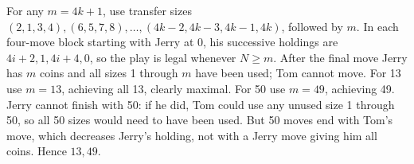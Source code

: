 For any $m=4k+1$, use transfer sizes $(2,1,3,4),(6,5,7,8),\ldots,(4k-2,4k-3,4k-1,4k)$, followed by $m$. In each four-move block starting with Jerry at 0, his successive holdings are $4i+2,1,4i+4,0$, so the play is legal whenever $N\ge m$. After the final move Jerry has $m$ coins and all sizes 1 through $m$ have been used; Tom cannot move. For 13 use $m=13$, achieving all 13, clearly maximal. For 50 use $m=49$, achieving 49. Jerry cannot finish with 50: if he did, Tom could use any unused size 1 through 50, so all 50 sizes would need to have been used. But 50 moves end with Tom's move, which decreases Jerry's holding, not with a Jerry move giving him all coins. Hence $\boxed{13,49}$.
